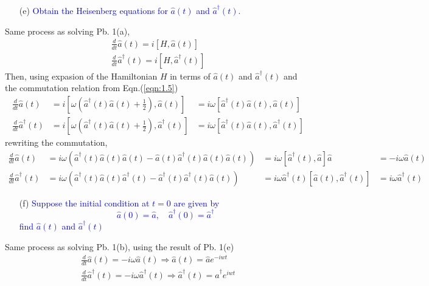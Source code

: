 \documentclass[11pt, a4paper]{article}
\begin{document}
\begin{enumerate}
    \item [(e)] \textcolor{blue}{
    Obtain the Heisenberg equations for $\hat{a}(t)$ and $\hat{a}^\dagger(t)$.
    }
\end{enumerate}
Same process as solving Pb. 1(a),
\begin{align}
    \frac{d}{dt} \hat{a}(t) = i[H, \hat{a}(t)] \\
    \frac{d}{dt} \hat{a}^\dagger(t) = i[H, \hat{a}^\dagger(t)]
\end{align}
Then, using expasion of the Hamiltonian $H$ in terms of $\hat{a}(t)$ and $\hat{a}^\dagger(t)$ and the commutation relation from Eqn.(\ref{eqn:1.5})
\begin{align}
    \frac{d}{dt} \hat{a}(t) & = i\left[\omega \left( \hat{a}^\dagger(t)\hat{a}(t) + \frac{1}{2} \right), \hat{a}(t)\right] & = i\omega [\hat{a}^\dagger(t)\hat{a}(t), \hat{a}(t)] \\
    \frac{d}{dt} \hat{a}^\dagger(t) & = i\left[\omega \left( \hat{a}^\dagger(t)\hat{a}(t) + \frac{1}{2} \right), \hat{a}^\dagger(t)\right] & = i\omega [\hat{a}^\dagger(t)\hat{a}(t), \hat{a}^\dagger(t)]
\end{align}
rewriting the commutation,
\begin{align}
    \frac{d}{dt} \hat{a}(t) & = i\omega(\hat{a}^\dagger(t)\hat{a}(t)\hat{a}(t) - \hat{a}(t)\hat{a}^\dagger(t)\hat{a}(t)\hat{a}(t)) & = i\omega[\hat{a}^\dagger(t), \hat{a}]\hat{a} & = -i\omega\hat{a}(t)\\
    \frac{d}{dt} \hat{a}^\dagger(t) & = i\omega(\hat{a}^\dagger(t)\hat{a}(t)\hat{a}^\dagger(t) - \hat{a}^\dagger(t)\hat{a}^\dagger(t)\hat{a}(t)) & = i\omega \hat{a}^\dagger(t) [\hat{a}(t), \hat{a}^\dagger(t)] & = i\omega \hat{a}^\dagger(t)
\end{align}

\newpage

\begin{enumerate}
    \item [(f)] \textcolor{blue}{
    Suppose the initial condition at $t = 0$ are given by
    \begin{equation}\label{eqn:1.6}
        \hat{a}(0) = \hat{a},\quad \hat{a}^{\dagger}(0) = \hat{a}^{\dagger}
    \end{equation}
    find $\hat{a}(t)$ and $\hat{a}^{\dagger}(t)$
    }
\end{enumerate}
Same process as solving Pb. 1(b), using the result of Pb. 1(e)
\begin{align}
    \frac{d}{dt}\hat{a}(t) = -i\omega \hat{a}(t) \Rightarrow \hat{a}(t) = \hat{a}e^{-iwt} \\
    \frac{d}{dt}\hat{a}^{\dagger}(t) = -i\omega \hat{a}^{\dagger}(t) \Rightarrow \hat{a}^{\dagger}(t) = \hat{a}^{\dagger}e^{iwt}
\end{align}
\end{document}
